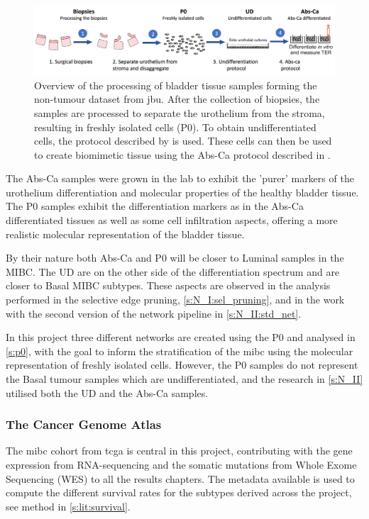 \begin{figure}[!htb]
    \centering
    \includegraphics[width=1.0\textwidth, keepaspectratio]{Sections/Lit_review/Resources/differentiation.png}
    \caption{Overview of the processing of bladder tissue samples forming the non-tumour dataset from \acrfull{jbu}. After the collection of biopsies, the samples are processed to separate the urothelium from the stroma, resulting in freshly isolated cells (P0). To obtain undifferentiated cells, the protocol described by \citet{Cross2005-fe} is used. These cells can then be used to create biomimetic tissue using the Abs-Ca protocol described in \citet{Cross2005-fe}.}
    \label{fig:lit:diff_samples}
\end{figure}

The Abs-Ca samples were grown in the lab to exhibit the 'purer' markers of the urothelium differentiation and molecular properties of the healthy bladder tissue. The P0 samples exhibit the differentiation markers as in the Abs-Ca differentiated tissues as well as some cell infiltration aspects, offering a more realistic molecular representation of the bladder tissue. 

By their nature both Abs-Ca and P0 will be closer to Luminal samples in the MIBC. The UD are on the other side of the differentiation spectrum and are closer to Basal MIBC subtypes. These aspects are observed in the analysis performed in the selective edge pruning, \cref{s:N_I:sel_pruning}, and in the work with the second version of the network pipeline in \cref{s:N_II:std_net}.

In this project three different networks are created using the P0 and analysed in \cref{s:p0}, with the goal to inform the stratification of the \acrfull{mibc} using the molecular representation of freshly isolated cells. However, the P0 samples do not represent the Basal tumour samples which are undifferentiated, and the research in \cref{s:N_II} utilised both the UD and the Abs-Ca samples.

\subsubsection*{The Cancer Genome Atlas} \label{s:lit:tcga_data}

The \acrshort{mibc} cohort from \acrfull{tcga} is central in this project, contributing with the gene expression from RNA-sequencing and the somatic mutations from Whole Exome Sequencing (WES) to all the results chapters. The metadata available is used to compute the different survival rates for the subtypes derived across the project, see method in \cref{s:lit:survival}.








